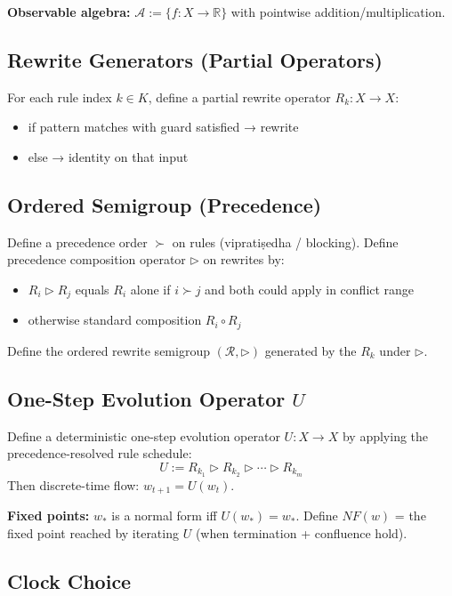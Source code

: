 \documentclass[12pt, oneside]{article}
\begin{document}
\textbf{Observable algebra:} $\mathcal{A} := \{ f: X \rightarrow \mathbb{R} \}$ with pointwise addition/multiplication.

\subsection{Rewrite Generators (Partial Operators)}

For each rule index $k \in K$, define a partial rewrite operator $R_k: X \rightarrow X$:
\begin{itemize}
    \item if pattern matches with guard satisfied → rewrite
    \item else → identity on that input
\end{itemize}

\subsection{Ordered Semigroup (Precedence)}

Define a precedence order $\succ$ on rules (vipratiṣedha / blocking). Define precedence composition operator $\triangleright$ on rewrites by:
\begin{itemize}
    \item $R_i \triangleright R_j$ equals $R_i$ alone if $i \succ j$ and both could apply in conflict range
    \item otherwise standard composition $R_i \circ R_j$
\end{itemize}
Define the ordered rewrite semigroup $(\mathcal{R}, \triangleright)$ generated by the $R_k$ under $\triangleright$.

\subsection{One-Step Evolution Operator $U$}

Define a deterministic one-step evolution operator $U: X \rightarrow X$ by applying the precedence-resolved rule schedule:
\begin{equation}
U := R_{k_1} \triangleright R_{k_2} \triangleright \cdots \triangleright R_{k_m}
\end{equation}
Then discrete-time flow: $w_{t+1} = U(w_t)$.

\textbf{Fixed points:} $w_*$ is a normal form iff $U(w_*) = w_*$. Define $NF(w)$ = the fixed point reached by iterating $U$ (when termination + confluence hold).

\subsection{Clock Choice}
\end{document}
